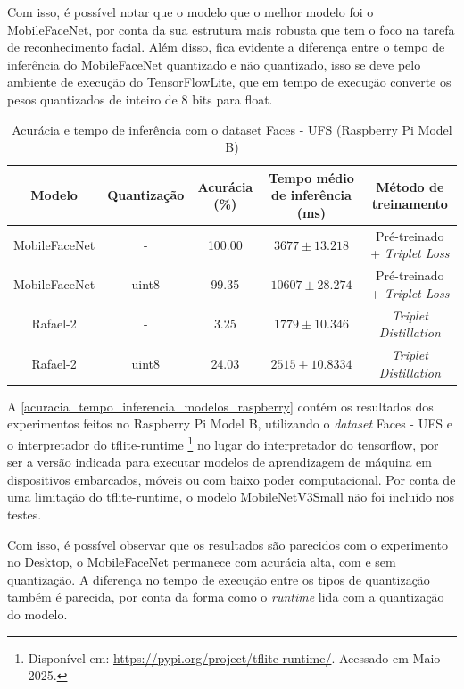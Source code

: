 Com isso, é possível notar que o modelo que o melhor modelo foi o MobileFaceNet, por conta da sua estrutura
mais robusta que tem o foco na tarefa de reconhecimento facial. Além disso, fica evidente a diferença entre
o tempo de inferência do MobileFaceNet quantizado e não quantizado, isso se deve pelo ambiente de execução
do TensorFlowLite, que em tempo de execução converte os pesos quantizados de inteiro de 8 bits para float.


\begin{table}[htb]
\centering
\ABNTEXfontereduzida
\caption[Acurácia e tempo de inferência com o dataset Faces - UFS (Raspberry Pi Model B)]{Acurácia e tempo de inferência com o dataset Faces - UFS (Raspberry Pi Model B)}
\label{acuracia_tempo_inferencia_modelos_raspberry}
\begin{tabular}{ |c|c|c|c|c| }
	\hline
	\textbf{Modelo} & \textbf{Quantização} & \textbf{Acurácia (\%)} & \textbf{Tempo médio de inferência (ms)} & \textbf{Método de treinamento} \\
	\hline
	MobileFaceNet 	&-	& 	100.00  & $3677 \pm 13.218$ & Pré-treinado + \textit{Triplet Loss} \\
	MobileFaceNet 	&uint8	& 	 99.35  & $10607 \pm 28.274$ & Pré-treinado + \textit{Triplet Loss} \\
	Rafael-2	&-	& 	 3.25 	& $1779 \pm 10.346$ & \textit{Triplet Distillation} \\
	Rafael-2	&uint8	& 	 24.03	& $2515 \pm 10.8334$ & \textit{Triplet Distillation} \\
	\hline
\end{tabular}
\end{table}

A \autoref{acuracia_tempo_inferencia_modelos_raspberry} contém os resultados dos experimentos feitos no
Raspberry Pi Model B, utilizando o \textit{dataset} Faces - UFS e o interpretador do tflite-runtime
\footnote{Disponível em: \url{https://pypi.org/project/tflite-runtime/}. Acessado em Maio 2025.}
no lugar do interpretador do tensorflow, por ser a versão indicada para executar modelos de aprendizagem de
máquina em dispositivos embarcados, móveis ou com baixo poder computacional. Por conta de uma limitação
do tflite-runtime, o modelo MobileNetV3Small não foi incluído nos testes.

Com isso, é possível observar que os resultados são parecidos com o experimento no Desktop, o MobileFaceNet
permanece com acurácia alta, com e sem quantização. A diferença no tempo de execução entre os tipos de
quantização também é parecida, por conta da forma como o \textit{runtime} lida com a quantização do modelo.

